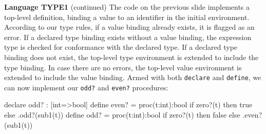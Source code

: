 \begin{minipage}[t]{\sw}
\slidenumber
\LARGE
{\bf Language TYPE1} (continued)\exx
The code on the previous slide
implements a top-level definition,
binding a value to an identifier
in the initial environment.
According to our type rules,
if a value binding already exists,
it is flagged as an error.
If a declared type binding exists without a value binding,
the expression type is checked for conformance
with the declared type.
If a declared type binding does not exist,
the top-level type environment is extended
to include the type binding.
In case there are no errors,
the top-level value environment is extended
to include the value binding.\exx
Armed with both \verb'declare' and \verb'define',
we can now implement our \verb'odd?' and \verb'even?' procedures:
\Large
\begin{qv}
declare odd? : [int=>bool]
define even? =
    proc(t:int):bool if zero?(t) then true else .odd?(sub1(t))
define odd? =
    proc(t:int):bool if zero?(t) then false else .even?(sub1(t))
\end{qv}
\end{minipage}
